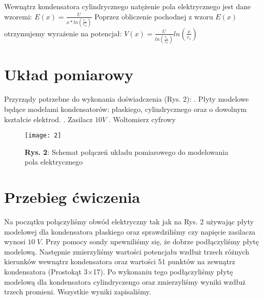 \documentclass[12pt]{article}
\begin{document}
Wewnątrz kondensatora cylindrycznego natężenie pola elektrycznego jest dane wzoremi: \newline \newline
{\Large$E(x)=\frac{U}{x*ln(\frac{r_z}{r_w})}$} \newline \newline
Poprzez obliczenie pochodnej z wzoru $E(x)$ otrzymujemy wyrażenie na potencjał: \newline \newline
{\Large $V(x)=\frac{U}{ln(\frac{r_z}{r_w})}ln(\frac{x}{r_z})$} \newline \newline
\newpage \section{Układ pomiarowy}
Przyrządy potrzebne do wykonania doświadczenia (Rys. 2): . Płyty modelowe będące modelami kondensatorów: płaskiego, cylindrycznego oraz o dowolnym kształcie elektrod. . Zasilacz $10V$ . Woltomierz cyfrowy \newline
\begin{figure}[H]
\centering
\texttt{[image: 2]}
\caption*{\textbf{Rys. 2}: Schemat połączeń układu pomiarowego do modelowania pola elektrycznego }
\end{figure} 
\section{Przebieg ćwiczenia}
Na początku połączyliśmy obwód elektryczny tak jak na Rys. 2 używając płyty modelowej dla kondensatora płaskiego oraz sprawdziliśmy czy napięcie zasilacza wynosi $10\;V$. Przy pomocy sondy upewniliśmy się, że dobrze podłączyliśmy płytę modelową. Następnie zmierzyliśmy wartości potencjału wzdłuż trzech różnych kierunków wewnątrz kondensatora oraz wartości $51$ punktów na zewnątrz kondensatora (Prostokąt 3$\times$17). Po wykonaniu tego podłączyliśmy płytę modelową dla kondensatora cylindryczengo oraz zmierzyliśmy wyniki wzdłuż trzech promieni. Wszystkie wyniki zapisaliśmy. \newpage
\end{document}
